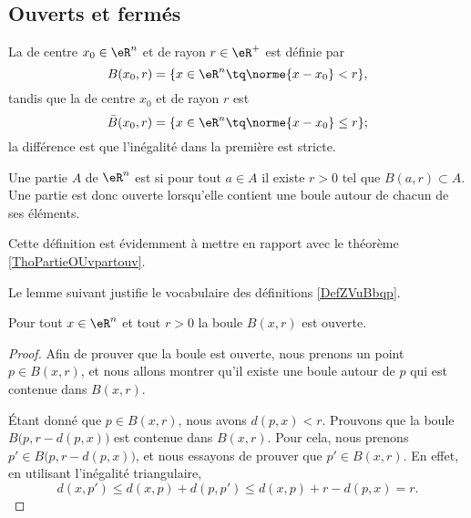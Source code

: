 \subsection{Ouverts et fermés}

\begin{definition}  \label{DefZVuBbqp}
	La  de centre $x_0 \in \eR^n$ et de rayon $r \in
	\eR^+$ est définie par
	\begin{equation}
		B(x_0,r) = \{ x \in \eR^n \tq \norme{x - x_0} < r \},
	\end{equation}
	tandis que la  de centre $x_0$ et de rayon $r$ est
	\begin{equation}
		\bar B(x_0,r) = \{ x \in \eR^n \tq \norme{x - x_0} \leq r \};
	\end{equation}
	la différence est que l'inégalité dans la première est stricte.
\end{definition}

\begin{definition}  \label{DefUOyCQtW}
    Une partie \( A\) de \( \eR^n\) est  si pour tout \( a\in A\) il existe \( r>0\) tel que \( B(a,r)\subset A\). Une partie est donc ouverte lorsqu'elle contient une boule autour de chacun de ses éléments. 
\end{definition}
Cette définition est évidemment à mettre en rapport avec le théorème \ref{ThoPartieOUvpartouv}.

Le lemme suivant justifie le vocabulaire des définitions \ref{DefZVuBbqp}.
\begin{lemma}   \label{LemMESSExh}
    Pour tout $x \in \eR^n$ et tout $r >0$ la boule \( B(x,r)\) est ouverte.
\end{lemma}

\begin{proof}
    Afin de prouver que la boule est ouverte, nous prenons un point $p\in B(x,r)$, et nous allons montrer qu'il existe une boule autour de $p$ qui est contenue dans $B(x,r)$.

    Étant donné que $p\in B(x,r)$, nous avons $d(p,x)<r$. Prouvons que la boule $B\big(p,r-d(p,x)\big)$ est contenue dans $B(x,r)$. Pour cela, nous prenons $p'\in B\big(p,r-d(p,x)\big)$, et nous essayons de prouver que $p'\in B(x,r)$. En effet, en utilisant l'inégalité triangulaire,
    \begin{equation}
	    d(x,p')\leq d(x,p)+d(p,p')\leq d(x,p)+r-d(p,x)=r.
    \end{equation}
\end{proof}

